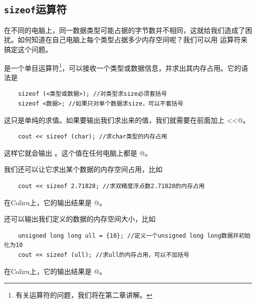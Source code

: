 \subsection*{\texttt{sizeof}运算符}
在不同的电脑上，同一数据类型可能占据的字节数并不相同，这就给我们造成了困扰。如何知道在自己电脑上每个类型占据多少内存空间呢？我们可以用 \lstinline@sizeof@ 运算符来搞定这个问题。\par
\lstinline@sizeof@ 是一个单目运算符\footnote{有关运算符的问题，我们将在第二章讲解。}，可以接收一个类型或数据信息，并求出其内存占用。它的语法是
\begin{lstlisting}
    sizeof (<类型或数据>); //对类型求size必须套括号
    sizeof <数据>; //如果只对单个数据求size，可以不套括号
\end{lstlisting}
这只是单纯的求值。如果要输出我们求出来的值，我们就需要在前面加上 \lstinline@cout<<@。
\begin{lstlisting}
    cout << sizeof (char); //求char类型的内存占用
\end{lstlisting}
这样它就会输出 。这个值在任何电脑上都是 @。\par
我们还可以让它求出某个数据的内存空间占用，比如
\begin{lstlisting}
    cout << sizeof 2.71828; //求双精度浮点数2.71828的内存占用
\end{lstlisting}
在Coliru上，它的输出结果是 @。\par
还可以输出我们定义的数据的内存空间大小，比如
\begin{lstlisting}
    unsigned long long ull = {10}; //定义一个unsigned long long数据并初始化为10
    cout << sizeof (ull); //求ull的内存占用，可以不加括号
\end{lstlisting}
在Coliru上，它的输出结果是 @。\par
